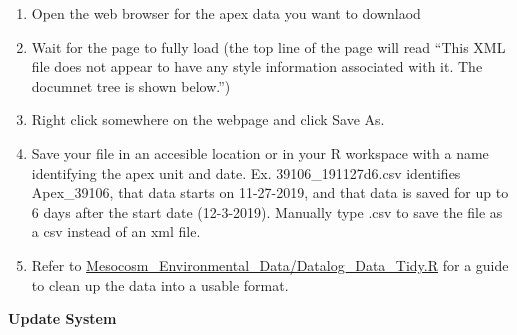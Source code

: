 \documentclass[]{book}
\providecommand{\tightlist}{%
  \setlength{\itemsep}{0pt}\setlength{\parskip}{0pt}}
\begin{document}
\begin{enumerate}
  \begin{enumerate}
  \def\labelenumii{\arabic{enumii}.}
  \tightlist
  \item
    Open the web browser for the apex data you want to downlaod
  \item
    Wait for the page to fully load (the top line of the page will read
    ``This XML file does not appear to have any style information
    associated with it. The documnet tree is shown below.'')
  \item
    Right click somewhere on the webpage and click Save As.
  \item
    Save your file in an accesible location or in your R workspace with
    a name identifying the apex unit and date. Ex. 39106\_191127d6.csv
    identifies Apex\_39106, that data starts on 11-27-2019, and that
    data is saved for up to 6 days after the start date (12-3-2019).
    Manually type .csv to save the file as a csv instead of an xml file.
  \item
    Refer to
    \href{https://github.com/SilbigerLab/Mesocosm_Environmental_Data/blob/master/Datalog_Data_Tidy.R}{Mesocosm\_Environmental\_Data/Datalog\_Data\_Tidy.R}
    for a guide to clean up the data into a usable format.
  \end{enumerate}
\end{enumerate}

 \textbf{Update System}
\end{document}
